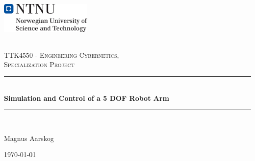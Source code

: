 \begin{titlepage}
    \includegraphics[height=1.5cm]{img/NTNUlogo.jpg}\\[1cm]   
    \begin{center}

    ~\\[1.5cm]
    
    \textsc{\Large TTK4550 - Engineering Cybernetics, \\Specialization Project}\\[0.5cm]
    
    \hrule ~\\[0.2cm]
    {\huge \bfseries Simulation and Control of a 5 DOF Robot Arm}\\[0.4cm]		%
    \hrule ~\\[1.5cm]
    
    \begin{minipage}{0.4\textwidth}
        \centering
    	\large
    		Magnus Aarskog
    \end{minipage}
    
    \vfill
    
    {\large \today}
    
    \end{center}
\end{titlepage}